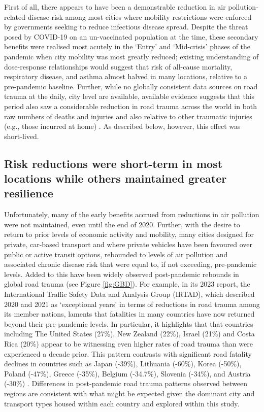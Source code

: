 \documentclass[preprint,10pt]{elsarticle} %
\begin{document}
First of all, there appears to have been a demonstrable reduction in air pollution-related disease risk among most cities where mobility restrictions were enforced by governments seeking to reduce infectious disease spread. Despite the threat posed by COVID-19 on an un-vaccinated population at the time, these secondary benefits were realised most acutely in the `Entry' and `Mid-crisis' phases of the pandemic when city mobility was most greatly reduced; existing understanding of dose-response relationships would suggest that risk of all-cause mortality, respiratory disease, and asthma  almost halved in many locations, relative to a pre-pandemic baseline. Further, while no globally consistent data sources on road trauma at the daily, city level are available, available evidence suggests that this period also saw a considerable reduction in road trauma across the world in both raw numbers of deaths and injuries \cite{saladie2023back,ITFRS2022,ITFRS2023,GBDStudy} and also relative to other traumatic injuries (e.g., those incurred at home) \cite{WASEEM2021200}. As described below, however, this effect was short-lived.

\subsection*{Risk reductions were short-term in most locations while others maintained greater resilience}
Unfortunately, many of the early benefits accrued from reductions in air pollution were not maintained, even until the end of 2020. Further, with the desire to return to prior levels of economic activity and mobility, many cities designed for private, car-based transport and where private vehicles have been favoured over public or active transit options\cite{DAS20211}, rebounded to levels of air pollution and associated chronic disease risk that were equal to, if not exceeding, pre-pandemic levels. Added to this have been widely observed post-pandemic rebounds in global road trauma (see Figure \ref{fig:GBD}). For example, in its 2023 report, the International Traffic Safety Data and Analysis Group (IRTAD), which described 2020 and 2021 as `exceptional years' in terms of reductions in road trauma among its member nations, laments that fatalities in many countries have now returned beyond their pre-pandemic levels. In particular, it highlights that that countries including The United States (27\%), New Zealand (22\%), Israel (21\%) and Costa Rica (20\%) appear to be witnessing even higher rates of road trauma than were experienced a decade prior. This pattern contrasts with significant road fatality declines in countries such as Japan (-39\%), Lithuania (-60\%), Korea (-50\%), Poland (-47\%), Greece (-35\%), Belgium (-34.7\%), Slovenia (-34\%), and Austria (-30\%) \cite{ITFRS2022,ITFRS2023}. Differences in post-pandemic road trauma patterns observed between regions are consistent with what might be expected given the dominant city and transport types housed within each country and explored within this study.
\end{document}

